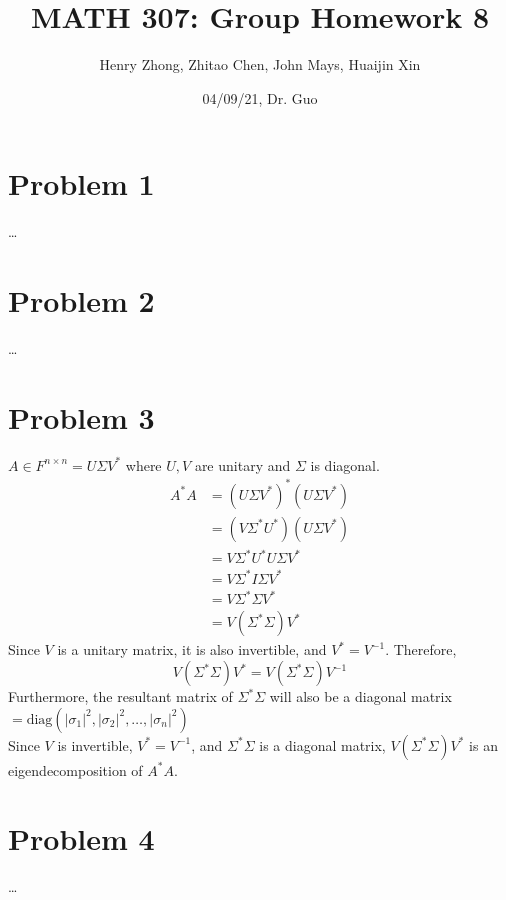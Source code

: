 \documentclass[fleqn]{article}
\title{\textbf{MATH 307: Group Homework 8}}
\author{Henry Zhong, Zhitao Chen, John Mays, Huaijin Xin}
\date{04/09/21, Dr. Guo}
\begin{document}
\maketitle

\section*{Problem 1}
\dots
\section*{Problem 2}
\dots
\section*{Problem 3}
$A\in F^{n \times n} = U\Sigma V^{*}$ where $U, V$ are unitary and $\Sigma$ is diagonal.\\
\begin{equation*}
    \begin{split}
        A^{*}A& =(U \Sigma V^{*})^{*}(U \Sigma V^{*})\\
        &=(V \Sigma^{*} U^{*})(U \Sigma V^{*})\\
        &= V \Sigma^{*} U^{*}U \Sigma V^{*}\\
        &= V \Sigma^{*} I \Sigma V^{*}\\
        &= V \Sigma^{*} \Sigma V^{*}\\ 
        &= V (\Sigma^{*} \Sigma) V^{*}
    \end{split}
\end{equation*}
Since $V$ is a unitary matrix, it is also invertible, and $V^{*}=V^{-1}$. Therefore,\\
\begin{equation*}
    V (\Sigma^{*} \Sigma) V^{*} = V (\Sigma^{*} \Sigma) V^{-1}
\end{equation*}
Furthermore, the resultant matrix of $\Sigma^{*}\Sigma$ will also be a diagonal matrix $=\text{diag}(|\sigma_1|^2,|\sigma_2|^2,\dots, |\sigma_n|^2)$\\
\linebreak
Since $V$ is invertible, $V^{*} = V^{-1}$, and $\Sigma^{*}\Sigma$ is a diagonal matrix, $V (\Sigma^{*}\Sigma) V^{*}$ is an eigendecomposition of $A^{*}A$.
\section*{Problem 4}
\dots
\end{document}
